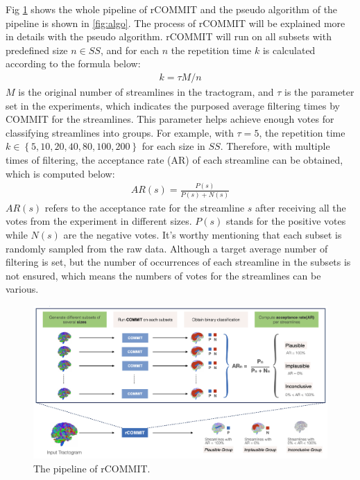 Fig \ref{fig:pipe} shows the whole pipeline of rCOMMIT and the pseudo algorithm of the pipeline is shown in \ref{fig:algo}. 
The process of rCOMMIT will be explained more in details with the pseudo algorithm. rCOMMIT will run on all subsets with predefined
size $n \in SS$, and for each $n$ the repetition time $k$ is calculated according to the formula below:
\begin{gather}\label{computek}  
    k = \tau M/n
\end{gather}
$M$ is the original number of streamlines in the tractogram, and $\tau$ is the parameter set in the experiments, 
which indicates the purposed average filtering times by COMMIT for the streamlines. This parameter helps achieve enough votes for classifying streamlines into groups.
For example, with $\tau=5$, the repetition time $k \in \left \{5, 10, 20, 40, 80, 100, 200 \right \}$ for each size in $SS$.
Therefore, with multiple times of filtering, the acceptance rate (AR) of each streamline can be obtained, which is computed below:
\begin{gather}\label{AR}
    AR(s) = \frac{P(s)}{P(s)+ N(s)}
\end{gather}
$AR(s)$ refers to the acceptance rate for the streamline $s$ after receiving all the votes from the experiment in different sizes.
$P(s)$ stands for the positive votes while $N(s)$ are the negative votes.
It's worthy mentioning that each subset is randomly sampled from the raw data. 
Although a target average number of filtering is set, but the number of occurrences of each streamline in the subsets is not ensured, 
which means the numbers of votes for the streamlines can be various.

\begin{figure}[ht]
    \centering
    \includegraphics[width= 16cm]{figures/pipe.jpg}
        \caption{The pipeline of rCOMMIT. 
        }
    \label{fig:pipe}
\end{figure}


